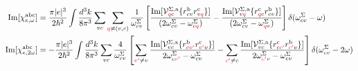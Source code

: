 \documentclass{article}
\begin{document}
\begin{equation*}\label{eq:chis}
\begin{split}
\mathrm{Im}[\chi^{\mathrm{a}\mathrm{b}\mathrm{c}}_{e,\omega}]&= 
\frac{\pi |e|^3}{2\hbar^2}
\int \frac{d^{3}k}{8\pi^3}
\sum_{vc}\sum_{\textcolor{red}{q}\neq(v,c)}\frac{1}{\omega^\Sigma_{cv}}
\left[
\frac{\mathrm{Im}[\mathcal{V}^{\Sigma,\mathrm{a}}_{\textcolor{red}{q}c}
\{r^{\mathrm{b}}_{cv}r^{\mathrm{c}}_{v\textcolor{red}{q}}\}]}
{(2\omega^\Sigma_{cv}-\omega^\Sigma_{c\textcolor{red}{q}})} 
-\frac{\mathrm{Im}[\mathcal{V}^{\Sigma,\mathrm{a}}_{v\textcolor{red}{q}}
\{r^{\mathrm{c}}_{\textcolor{red}{q}c}r^{\mathrm{b}}_{cv}\}]}
{(2\omega^\Sigma_{cv}-\omega^\Sigma_{\textcolor{red}{q}v})}
\right]\delta(\omega^\Sigma_{cv}-\omega)\\
\mathrm{Im}[\chi^{\mathrm{a}\mathrm{b}\mathrm{c}}_{e,2\omega}]&= 
-\frac{\pi |e|^3}{2\hbar^2}
\int \frac{d^{3}k}{8\pi^3}
\sum_{vc}\frac{4}{\omega^\Sigma_{cv}}
\left[
\sum_{\textcolor{red}{v'}\ne
  v}\frac{\mathrm{Im}[\mathcal{V}^{\Sigma,\mathrm{a}}_{vc}
  \{r^{\mathrm{b}}_{c\textcolor{red}{v'}}r^{\mathrm{c}}_{\textcolor{red}{v'}v}\}]}
{2\omega^\Sigma_{c\textcolor{red}{v'}}-\omega^\Sigma_{cv}}
- \sum_{\textcolor{red}{c'}\ne
  c}\frac{\mathrm{Im}[\mathcal{V}^{\Sigma,\mathrm{a}}_{vc}
  \{r^{\mathrm{c}}_{c\textcolor{red}{c'}}r^{\mathrm{b}}_{\textcolor{red}{c'}v}\}]}
{2\omega^\Sigma_{\textcolor{red}{c'}v}-\omega^\Sigma_{cv}}
\right]\delta(\omega^\Sigma_{cv}-2\omega)
\end{split}
\end{equation*}
\end{document}
